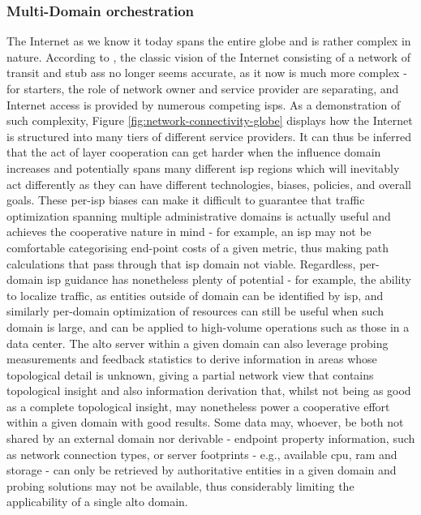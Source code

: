\subsubsection{Multi-Domain orchestration}

    The Internet as we know it today spans the entire globe and is rather complex in nature.
    According to \cite{dan-Commag10}, the classic vision of the Internet consisting of a network of transit and stub \glspl{as} no longer seems accurate, as it now is much more complex - for starters, the role of network owner and service provider are separating, and Internet access is provided by numerous competing \glspl{isp}.
    As a demonstration of such complexity, Figure \ref{fig:network-connectivity-globe} displays how the Internet is structured into many tiers of different service providers.
    It can thus be inferred that the act of layer cooperation can get harder when the influence domain increases and potentially spans many different \gls{isp} regions which will inevitably act differently as they can have different technologies, biases, policies, and overall goals.
    These per-\gls{isp} biases can make it difficult to guarantee that traffic optimization spanning multiple administrative domains is actually useful and achieves the cooperative nature in mind - for example, an \gls{isp} may not be comfortable categorising end-point costs of a given metric, thus making path calculations that pass through that \gls{isp} domain not viable.
    Regardless, per-domain \gls{isp} guidance has nonetheless plenty of potential - for example, the ability to localize traffic, as entities outside of domain can be identified by \gls{isp}, and similarly per-domain optimization of resources can still be useful when such domain is large, and can be applied to high-volume operations such as those in a data center.
    The \gls{alto} server within a given domain can also leverage probing measurements and feedback statistics to derive information in areas whose topological detail is unknown, giving a partial network view that contains topological insight and also information derivation that, whilst not being as good as a complete topological insight, may nonetheless power a cooperative effort within a given domain with good results.
    Some data may, whoever, be both not shared by an external domain nor derivable - endpoint property information, such as network connection types, or server footprints - e.g., available \gls{cpu}, \gls{ram} and storage - can only be retrieved by authoritative entities in a given domain and probing solutions may not be available, thus considerably limiting the applicability of a single \gls{alto} domain.

